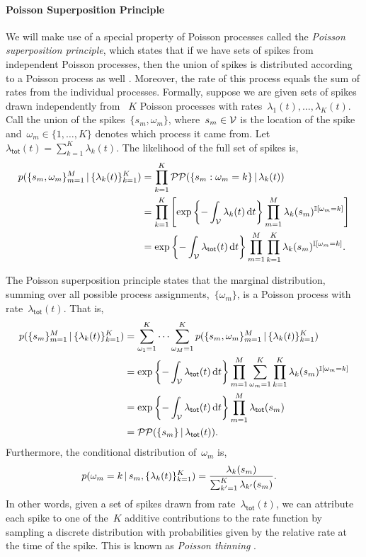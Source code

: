 \paragraph{Poisson Superposition Principle}
We will make use of a special property of Poisson processes called the
\emph{Poisson superposition principle}, which states that if we have 
sets of spikes from independent Poisson processes, then the union of spikes 
is distributed according to a Poisson process as well \citep{Kingman-1993}.
Moreover, the rate of this process equals the sum of 
rates from the individual processes. 
Formally, suppose we are given sets of spikes drawn independently
from ~$K$ Poisson processes with rates~${\lambda_1(t), \ldots,
  \lambda_K(t)}$.  Call the union of the spikes~${\{s_m,
  \omega_m\}}$, where~${s_m \in \mathcal{V}}$ is the location of the spike
and~${\omega_m \in \{1, \ldots, K\}}$ denotes which process it came
from. Let~${\lambda_{\mathsf{tot}}(t) = \sum_{k=1}^K \lambda_k(t)}$.
The likelihood of the full set of spikes is,
\begin{align*}
  p(\{s_m, \omega_m\}_{m=1}^M \,|\, \{\lambda_k(t)\}_{k=1}^K)
  &= \prod_{k=1}^K \mathcal{PP}(\{s_m: \omega_m=k\} \,|\, \lambda_k(t)) \\
  &= \prod_{k=1}^K \left[
    \exp\left\{-\int_{\mathcal{V}} \lambda_k(t) \, \mathrm{d}t\right\}
    \prod_{m=1}^M \lambda_k(s_m)^{\mathbb{I}[\omega_m = k]} \right] \\
  &= \exp\left\{-\int_{\mathcal{V}} \lambda_{\mathsf{tot}}(t) \, \mathrm{d}t\right\}
  \prod_{m=1}^M \prod_{k=1}^K \lambda_k(s_m)^{\mathbb{I}[\omega_m = k]}.
\end{align*}

The Poisson superposition principle states that the marginal distribution,
summing over all possible process assignments,~$\{\omega_m\}$, is a Poisson
process with rate~$\lambda_{\mathsf{tot}}(t)$. That is,
\begin{align*}
  p(\{s_m\}_{m=1}^M \,|\, \{\lambda_k(t)\}_{k=1}^K)
  &= \sum_{\omega_1=1}^K \cdots \sum_{\omega_M=1}^K p(\{s_m, \omega_m\}_{m=1}^M \,|\, \{\lambda_k(t)\}_{k=1}^K) \\
  &= \exp\left\{-\int_{\mathcal{V}} \lambda_{\mathsf{tot}}(t) \, \mathrm{d}t\right\}
  \prod_{m=1}^M \sum_{\omega_m=1}^K \prod_{k=1}^K \lambda_k(s_m)^{\mathbb{I}[\omega_m = k]} \\
  &= \exp\left\{-\int_{\mathcal{V}} \lambda_{\mathsf{tot}}(t) \, \mathrm{d}t\right\}
  \prod_{m=1}^M \lambda_{\mathsf{tot}}(s_m) \\
  &= \mathcal{PP}(\{s_m\} \,|\, \lambda_{\mathsf{tot}}(t)).
\end{align*}
Furthermore, the conditional distribution of~$\omega_m$ is,
\begin{align*}
  p(\omega_m=k \,|\, s_m, \{\lambda_k(t)\}_{k=1}^K)
  &= \frac{\lambda_k(s_m)}{\sum_{k'=1}^K \lambda_{k'}(s_m)}.
\end{align*}
In other words, given a set of spikes drawn from rate~$\lambda_{\mathsf{tot}}(t)$,
we can attribute each spike to one of the~$K$ additive contributions
to the rate function by sampling a discrete distribution with probabilities
given by the relative rate at the time of the spike. This is known as
\emph{Poisson thinning} \citep{Kingman-1993}.

